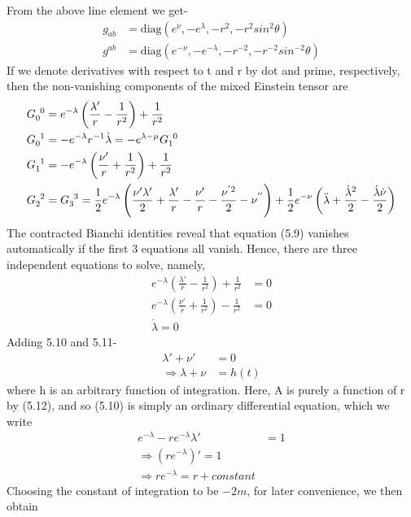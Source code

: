 \documentclass[12pt,a4paper]{article}
\numberwithin{table}{section}
\numberwithin{figure}{section}
\numberwithin{equation}{section}
\theoremstyle{remark}
\theoremstyle{definition}
\begin{document}
From the above line element we get-
$$ $$
\begin{align*}
    g_{ab}&=\text{diag}(e^{\nu},-e^{\lambda},-r^{2},-r^{2}sin^2\theta)\\
    g^{ab}&=\text{diag}(e^{-\nu},-e^{-\lambda},-r^{-2},-r^{-2}sin^{-2}\theta)
\end{align*}
If we denote derivatives with respect to t and r by dot and prime, respectively, then the non-vanishing components of the mixed Einstein tensor are
\begin{align}
     \tensor{G}{_0^0}&=e^{-\lambda}\left(\frac{\lambda'}{r}-\frac{1}{r^2} \right)+\frac{1}{r^2}\\
     \tensor{G}{_0^1}&=-e^{-\lambda}r^{-1}\dot{\lambda}=-e^{\lambda-\mu}\tensor{G}{_1^0}\\
     \tensor{G}{_1^1}&=-e^{-\lambda}\left(\frac{\nu'}{r}+\frac{1}{r^2} \right)+\frac{1}{r^2}\\
     \tensor{G}{_2^2}&=\tensor{G}{_3^3}=\frac{1}{2}e^{-\lambda}\left(\frac{\nu'\lambda'}{2}+\frac{\lambda'}{r}-\frac{\nu'}{r}-\frac{\nu^{'2}}{2}-\nu^{''}\right)+\frac{1}{2}e^{-\nu}\left(\ddot{\lambda}+\frac{\dot{\lambda}^2}{2}-\frac{\dot{\lambda}\dot{\nu}}{2}\right)
\end{align}
The contracted Bianchi identities reveal that equation (5.9) vanishes  
automatically if the first 3 equations all vanish. Hence, there are three independent equations to solve, namely,
\begin{align}
    e^{-\lambda}\left(\frac{\lambda'}{r}-\frac{1}{r^2} \right)+\frac{1}{r^2}&=0\\
    e^{-\lambda}\left(\frac{\nu'}{r}+\frac{1}{r^2} \right)-\frac{1}{r^2}&=0\\
    \dot{\lambda}=0
\end{align}
Adding 5.10 and 5.11-
\begin{align*}
    \lambda'+\nu'&=0\\
    \Rightarrow \lambda+\nu&=h(t)
\end{align*}
where h is an arbitrary function of integration. Here, A is purely a function of r by (5.12), and so (5.10) is simply an ordinary differential equation, which we write 
\begin{align}
    e^{-\lambda}-re^{-\lambda}\lambda'&=1\\
    \Rightarrow (re^{-\lambda})'=1\\
    \Rightarrow re^{-\lambda}=r+constant
\end{align}
Choosing the constant of integration to be $-2m$, for later convenience, we 
then obtain
\end{document}
